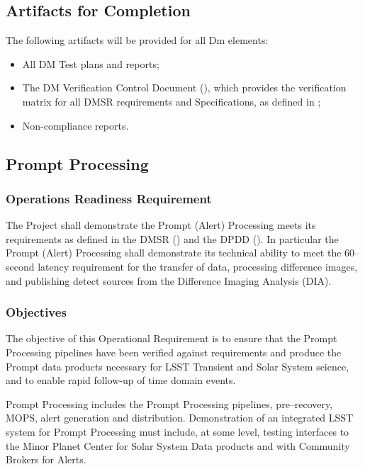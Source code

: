 \subsection{Artifacts for Completion}

The following artifacts will be provided for all Dm elements:

\begin{itemize}
	\item All DM Test plans and reports;
	\item The DM Verification Control Document (), which provides the verification matrix for all DMSR requirements and Specifications, as defined in ;
	\item Non-compliance reports.
\end{itemize}


\subsection{Prompt Processing}

\subsubsection{Operations Readiness Requirement}
The Project shall demonstrate the Prompt (Alert) Processing meets its requirements as defined in the DMSR () and the DPDD ().  In particular the Prompt (Alert) Processing shall demonstrate its technical ability to meet the 60--second latency requirement for the transfer of data, processing difference images, and publishing detect sources from the Difference Imaging Analysis (DIA). 

\subsubsection{Objectives} 

The objective of this Operational Requirement is to ensure that the Prompt Processing pipelines have been verified against requirements and produce the Prompt data products necessary for LSST Transient and Solar System science, and to enable rapid follow-up of time domain events. 

Prompt Processing includes the Prompt Processing pipelines, pre--recovery, MOPS, alert generation and distribution. Demonstration of an integrated LSST system for Prompt Processing must include, at some level, testing interfaces to the Minor Planet Center for Solar System Data products and with Community Brokers for Alerts. 

